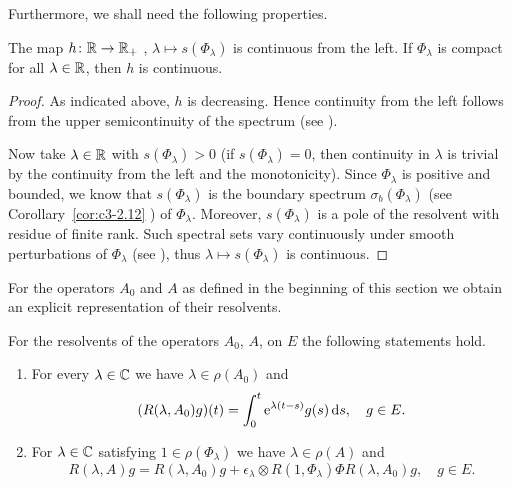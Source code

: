 Furthermore, we shall need the following properties.
\begin{lemma}\label{lem:c4-3.4}
%
The map $h \colon \mathbb{R} \to \mathbb{R}_{+}$ , $\lambda \mapsto s(\Phi_{\lambda})$ is continuous from the left. 
If\/ $\Phi_{\lambda}$ is compact for all $\lambda \in \mathbb{R}$, then $h$ is continuous.
\end{lemma}
\begin{proof}
As indicated above, $h$ is decreasing. Hence continuity from the left follows from the upper semicontinuity of the spectrum (see \textcite[Chapter IV, Theorem~3.1]{kato:1976}).

Now take $\lambda \in \mathbb{R}$ with $s(\Phi_{\lambda}) > 0$ (if\/ $s( \Phi_{\lambda}) = 0$, then continuity in $\lambda$ is trivial by the continuity from the left and the monotonicity). Since $\Phi_{\lambda}$ is positive and bounded, we know that 
$s(\Phi_{\lambda})$ is the boundary spectrum $\sigma_b(\Phi_{\lambda})$ (see Corollary~\ref{cor:c3-2.12} ) of\/ $\Phi_{\lambda}$. Moreover, $s(\Phi_{\lambda})$ is a pole of the resolvent with residue of finite rank. Such spectral sets vary continuously under smooth perturbations of\/ $\Phi_{\lambda}$ (see \textcite[VII.6, Theorem 9]{dunfordschwartz:1958}), thus $\lambda \mapsto s(\Phi_{\lambda})$ is continuous.
\end{proof}
For the operators $A_{0}$ and $A$ as defined in the beginning of this section we obtain an explicit representation of their resolvents.
\begin{lemma}\label{lem:c4-3.5}
For the resolvents of the operators $A_{0}$, \resp $A$, on $E$ the following statements hold.
\begin{enumerate}[\upshape (i)]
\item \label{lem:c4-3.5-1}
For every $\lambda \in \mathbb{C}$ we have $\lambda \in \rho(A_{0})$ and
\begin{equation}\label{eq:c4-3.7}
(R(\lambda,A_{0})g)(t) = \int_{0}^{t} \mathrm{e}^{\lambda(t-s)}g(s)\mathop{}\!\mathrm{d}{s}, \quad g \in E.
\end{equation}
\item \label{lem:c4-3.5-2}
For $\lambda \in \mathbb{C}$ satisfying $1 \in \rho(\Phi_{\lambda})$ we have $\lambda \in \rho(A)$ and
\begin{equation}\label{eq:c4-3.8}
R(\lambda,A)g = R(\lambda,A_{0})g + \epsilon_{\lambda} \otimes R(1,\Phi_{\lambda})\Phi R(\lambda,A_{0})g , \quad g \in E.
\end{equation}
\end{enumerate}
\end{lemma}
